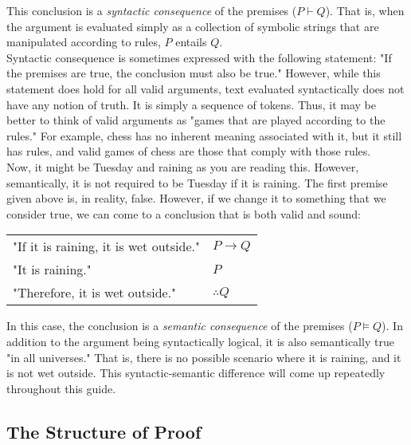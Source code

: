 This conclusion is a \textit{syntactic consequence} of the premises ($P\vdash Q$). That is, when the argument is evaluated simply as a collection of symbolic strings that are manipulated according to rules, $P$ entails $Q$. \\

Syntactic consequence is sometimes expressed with the following statement: "If the premises are true, the conclusion must also be true." However, while this statement does hold for all valid arguments, text evaluated syntactically does not have any notion of truth. It is simply a sequence of tokens. Thus, it may be better to think of valid arguments as "games that are played according to the rules." For example, chess has no inherent meaning associated with it, but it still has rules, and valid games of chess are those that comply with those rules. \\

Now, it might be Tuesday and raining as you are reading this. However, semantically, it is not required to be Tuesday if it is raining. The first premise given above is, in reality, false. However, if we change it to something that we consider true, we can come to a conclusion that is both valid and sound: \\

\begin{center}
	\begin{tabular*}{0.55\textwidth}{@{\extracolsep{\fill} } ll}
		\textnormal{"If it is raining, it is wet outside."} & $P\rightarrow Q$ \\
		\textnormal{"It is raining."} & $P$ \\
		\hline
		\textnormal{"Therefore, it is wet outside."} & $\therefore Q$ \\
	\end{tabular*}
\end{center}
\vspace{4mm}

In this case, the conclusion is a \textit{semantic consequence} of the premises ($P\vDash Q$). In addition to the argument being syntactically logical, it is also semantically true "in all universes." That is, there is no possible scenario where it is raining, and it is not wet outside. This syntactic-semantic difference will come up repeatedly throughout this guide. \\


\subsection{The Structure of Proof}

